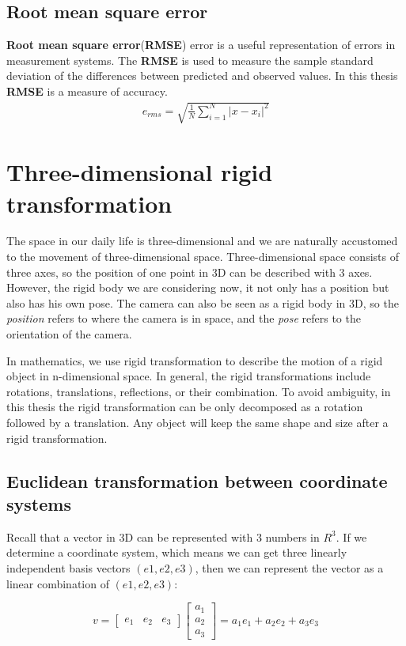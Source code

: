 \subsection{Root mean square error}
\textbf{Root mean square error}(\textbf{RMSE}) error is a useful representation of errors in measurement systems. The \textbf{RMSE} is used to measure the sample standard deviation of the differences between predicted and observed values. In this thesis \textbf{RMSE} is a measure of accuracy.
\begin{align*}  
e_{rms} = \sqrt{\frac{1}{N}\sum_{i=1}^{N}|x-x_i|^2}
\end{align*}

\section{Three-dimensional rigid transformation}
The space in our daily life is three-dimensional and we are naturally accustomed to the movement of three-dimensional space. Three-dimensional space consists of three axes, so the position of one point in 3D can be described with 3 axes. However, the rigid body we are considering now, it not only has a position but also has his own pose. The camera can also be seen as a rigid body in 3D, so the \textit{position} refers to where the camera is in space, and the \textit{pose} refers to the orientation of the camera.

In mathematics, we use rigid transformation to describe the motion of a rigid object in n-dimensional space. In general, the rigid transformations include rotations, translations, reflections, or their combination. To avoid ambiguity, in this thesis the rigid transformation can be only decomposed as a rotation followed by a translation. Any object will keep the same shape and size after a rigid transformation\cite{wiki_rt}.
 
\subsection{Euclidean transformation between coordinate systems}

Recall that a vector in 3D can be represented with 3 numbers in $R^3$. If we determine a coordinate system, which means we can get three linearly independent basis vectors $(e1, e2, e3)$, then we can represent the vector as a linear combination of $(e1, e2, e3)$:

\begin{equation*}
 v = 
     \begin{bmatrix} e_1 & e_2 & e_3 \end{bmatrix} 
     \begin{bmatrix} a_1 \\ a_2 \\ a_3 \end{bmatrix}
   = a_1e_1 + a_2e_2 + a_3e_3               
\end{equation*}

